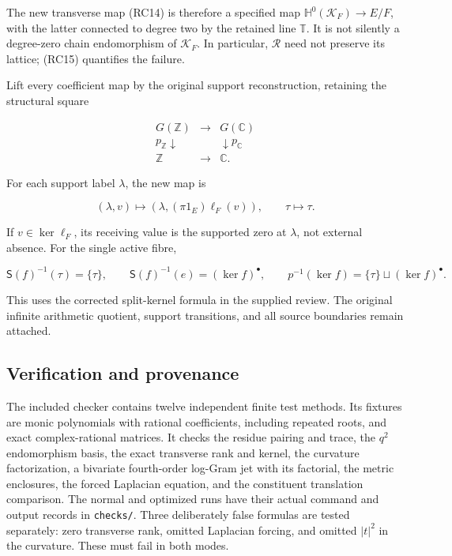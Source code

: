 The new transverse map (RC14) is therefore a specified map \(\mathbb H^0(\mathcal K_F)\to E/F\), with the latter connected to degree two by the retained line \(\mathbb T\). It is not silently a degree-zero chain endomorphism of \(\mathcal K_F\). In particular, \(\mathcal R\) need not preserve its lattice; (RC15) quantifies the failure.

Lift every coefficient map by the original support reconstruction, retaining the structural square

\[
\begin{array}{ccc}
G(\mathbb Z)&\longrightarrow&G(\mathbb C)\\
p_{\mathbb Z}\downarrow&&\downarrow p_{\mathbb C}\\
\mathbb Z&\longrightarrow&\mathbb C.
\end{array}
\tag{RC51}
\]

For each support label \(\lambda\), the new map is

\[
(\lambda,v)\longmapsto
(\lambda,(\pi1_E)\ell_F(v)),\qquad \tau\longmapsto\tau.
\tag{RC52}
\]

If \(v\in\ker\ell_F\), its receiving value is the supported zero at \(\lambda\), not external absence. For the single active fibre,

\[
\mathsf S(f)^{-1}(\tau)=\{\tau\},\qquad
\mathsf S(f)^{-1}(e)=(\ker f)^\bullet,
\qquad p^{-1}(\ker f)=\{\tau\}\sqcup(\ker f)^\bullet.
\tag{RC53}
\]

This uses the corrected split-kernel formula in the supplied review. The original infinite arithmetic quotient, support transitions, and all source boundaries remain attached.

\subsection{Verification and provenance}\label{endpoint-residue_original--verification-and-provenance}

The included checker contains twelve independent finite test methods. Its fixtures are monic polynomials with rational coefficients, including repeated roots, and exact complex-rational matrices. It checks the residue pairing and trace, the \(q^2\) endomorphism basis, the exact transverse rank and kernel, the curvature factorization, a bivariate fourth-order log-Gram jet with its factorial, the metric enclosures, the forced Laplacian equation, and the constituent translation comparison. The normal and optimized runs have their actual command and output records in \nolinkurl{checks/}. Three deliberately false formulas are tested separately: zero transverse rank, omitted Laplacian forcing, and omitted \(|t|^2\) in the curvature. These must fail in both modes.

